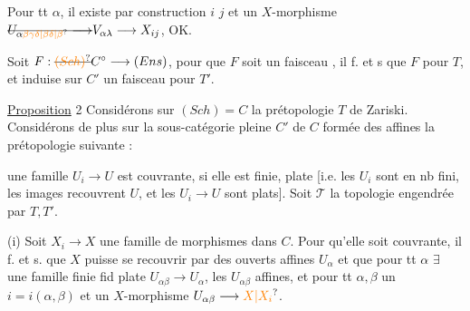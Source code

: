  Pour tt $\alpha$, il existe par construction $i$ $j$  et un $X$-morphisme $\deleted{U_{\alpha\unsure{\beta\gamma\delta|\beta\delta|\beta}}\longrightarrow} V_{\alpha\lambda}\longrightarrow X_{ij}$, OK.

 Soit $F:\deleted{\unsure{(Sch)}}C^{\circ}\longrightarrow(Ens)$, pour que $F$ soit un faisceau , il f. et s que $F$   pour $T$, et  induise sur $C'$ un faisceau pour $T'$.


\uline{Proposition} 2 Considérons sur $(Sch)=C$ la prétopologie $T$ de Zariski. Considérons de plus sur la sous-catégorie pleine $C'$ de $C$ formée des  affines la prétopologie suivante :



une famille \deleted{$\longrightarrow$} $U_i\longrightarrow U$ est couvrante, si elle est finie,   plate [i.e. les $U_i$ sont en nb fini, les images recouvrent $U$, et les $U_i\longrightarrow U$ sont plats]. Soit $\mathscr T$ la topologie  engendrée par $T,T'$.

(i) Soit $X_i\longrightarrow X$ une famille de morphismes dans $C$. Pour qu'elle soit couvrante, il f. et s. que  $X$ puisse se recouvrir par des ouverts affines $U_\alpha$ et que pour tt $\alpha$ $\exists$ une famille finie fid plate $U_{\alpha\beta}\longrightarrow U_\alpha$, les $U_{\alpha\beta}$ affines,  et pour tt $\alpha,\beta$ un $i=i(\alpha,\beta)$ et un $X$-morphisme $U_{\alpha\beta}\longrightarrow \unsure{X|X_i}$.


